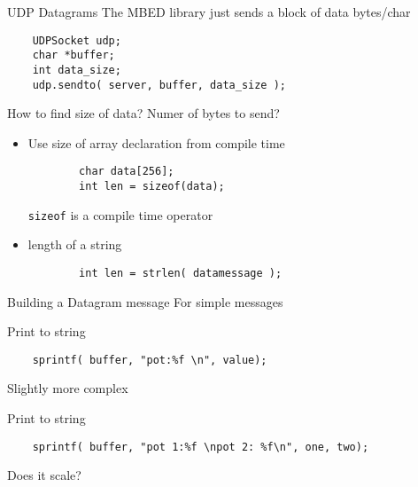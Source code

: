 \documentclass[xcolor=svgnames]{beamer}
\begin{document}
\begin{frame}[fragile]{UDP Datagrams}
The MBED library just sends a block of data bytes/char
\begin{exampleblock}{}
\begin{verbatim}
    UDPSocket udp;
    char *buffer;
    int data_size;
    udp.sendto( server, buffer, data_size );
\end{verbatim}
\end{exampleblock}
How to find size of data?  Numer of bytes to send?
\begin{itemize}
    \item Use size of array declaration from compile time
    \begin{verbatim}
        char data[256];
        int len = sizeof(data);
    \end{verbatim}
    \texttt{sizeof} is a compile time operator
    \item length of a string
    \begin{verbatim}
        int len = strlen( datamessage );
    \end{verbatim}
\end{itemize}
\end{frame}

\begin{frame}[fragile]{Building a Datagram message}
For simple messages
\begin{exampleblock}{Print to string}
\begin{verbatim}
    sprintf( buffer, "pot:%f \n", value);
\end{verbatim}
\end{exampleblock}

Slightly more complex
\begin{exampleblock}{Print to string}
\begin{verbatim}
    sprintf( buffer, "pot 1:%f \npot 2: %f\n", one, two);
\end{verbatim}
\end{exampleblock}

Does it scale?
\end{frame}
\end{document}
